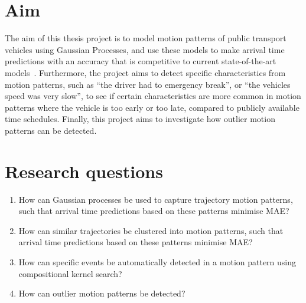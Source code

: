 
\section{Aim}\label{sec:aim}
The aim of this thesis project is to model motion patterns of public
transport vehicles using Gaussian Processes, and use these
models to make arrival time predictions with an accuracy that is
competitive to current state-of-the-art models~\cite{Sinn2012Sep,
  Gurmu2014, pang2018learning}. Furthermore, the project aims to
detect specific characteristics from motion patterns, such as ``the
driver had to emergency break'', or ``the vehicles speed was very slow'', to see if certain characteristics
are more common in motion patterns where the vehicle is too early or
too late, compared to publicly available time schedules. Finally, this
project aims to investigate how outlier motion patterns can be
detected.

\section{Research questions}\label{sec:research-questions}

\begin{enumerate}
\item How can Gaussian processes be used to capture trajectory motion
  patterns, such that arrival time predictions based on these patterns minimise MAE?

\item How can similar trajectories be clustered into motion patterns, 
  such that arrival time predictions based on these patterns minimise MAE?
  
\item How can specific events be automatically detected in a
  motion pattern using compositional kernel search?

\item How can outlier motion patterns be detected?
\end{enumerate}

